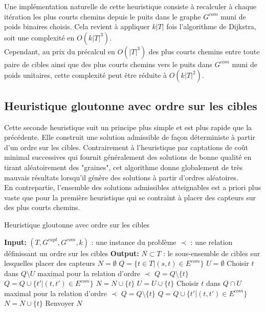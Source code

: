 \documentclass[12pt]{article}
\begin{document}
\bigskip

Une implémentation naturelle de cette heuristique consiste à recalculer à chaque itération les plus courts chemins depuis le puits dans le graphe $G^{com}$ muni de poids binaires choisis.
Cela revient à appliquer $k|T|$ fois l'algorithme de Dijkstra, soit une complexité en $O(k|T|^3)$.\\
Cependant, au prix du précalcul en $O(|T|^3)$ des plus courts chemins entre toute paire de cibles ainsi que des plus courts chemins vers le puits dans $G^{com}$ muni de poids unitaires, cette complexité peut être réduite à $O(k|T|^2)$.


\subsection{Heuristique gloutonne avec ordre sur les cibles}

Cette seconde heuristique suit un principe plus simple et est plus rapide que la précédente.
Elle construit une solution admissible de façon déterministe à partir d'un ordre sur les cibles.
Contrairement à l'heuristique par captations de coût minimal successives qui fournit généralement des solutions de bonne qualité en tirant aléatoirement des "graines", cet algorithme donne globalement de très mauvais résultats lorsqu'il génère des solutions à partir d'ordres aléatoires.\\
En contrepartie, l'ensemble des solutions admissibles atteignables est a priori plus vaste que pour la première heuristique qui se contraint à placer des capteurs sur des plus courts chemins.

\begin{algorithm}[H]
  \caption{Heuristique gloutonne avec ordre sur les cibles}
  \label{Heuristique gloutonne avec ordre sur les cibles}
  \begin{algorithmic}
      \STATE \textbf{Input:}
      \STATE $(T, G^{capt}, G^{com},k)$ : une instance du problème
      \STATE $\prec$ : une relation définissant un ordre sur les cibles
      \STATE
      \STATE \textbf{Output:} $N \subset T$ : le sous-ensemble de cibles sur lesquelles placer des capteurs
      \STATE
      \STATE $N = \emptyset$
      \STATE $Q = \{t \in T | (s, t) \in E^{com}\}$
      \STATE $U = \emptyset$
              \STATE Choisir $t$ dans $Q \setminus U$ maximal pour la relation d'ordre $\prec$
                  \STATE $Q  = Q \setminus \{t\}$
                  \STATE $Q  = Q \cup \{t' | (t, t') \in E^{com}\}$
                  \STATE $N  = N \cup \{t\}$
              \ELSE
                  \STATE $U  = U \cup \{t\}$
              \ENDIF
          \ELSE 
              \STATE Choisir $t$ dans $Q \cap U$ maximal pour la relation d'ordre $\prec$
              \STATE $Q  = Q \setminus \{t\}$
              \STATE $Q  = Q \cup \{t' | (t, t') \in E^{com}\}$
              \STATE $N  = N \cup \{t\}$
          \ENDIF
      \ENDWHILE
      \STATE Renvoyer $N$
  \end{algorithmic}
\end{algorithm}
\end{document}
